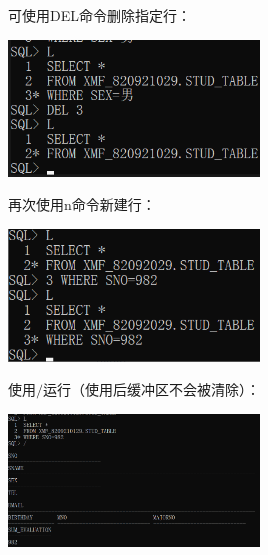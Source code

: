 \documentclass[11pt, a4paper, oneside, UTF8]{ctexbook}
\begin{document}
可使用DEL命令删除指定行：

\begin{center}
  \begin{minipage}{\textwidth}
    \center
    \includegraphics[width=0.5\textwidth]{picture/DEL命令效果.png}
    \captionsetup{hypcap=false}
    \label{fig:DEL命令效果}
  \end{minipage}
\end{center}

再次使用n命令新建行：

\begin{center}
  \begin{minipage}{\textwidth}
    \center
    \includegraphics[width=0.5\textwidth]{picture/N命令效果图.png}
    \captionsetup{hypcap=false}
    \label{fig:N命令效果}
  \end{minipage}
\end{center}

使用$\boldsymbol{/}$运行（使用后缓冲区不会被清除）：

\begin{center}
  \begin{minipage}{\textwidth}
    \center
    \includegraphics[width=0.5\textwidth]{picture/运行命令效果图.png}
    \captionsetup{hypcap=false}
    \label{fig:运行命令效果}
  \end{minipage}
\end{center}
\end{document}
